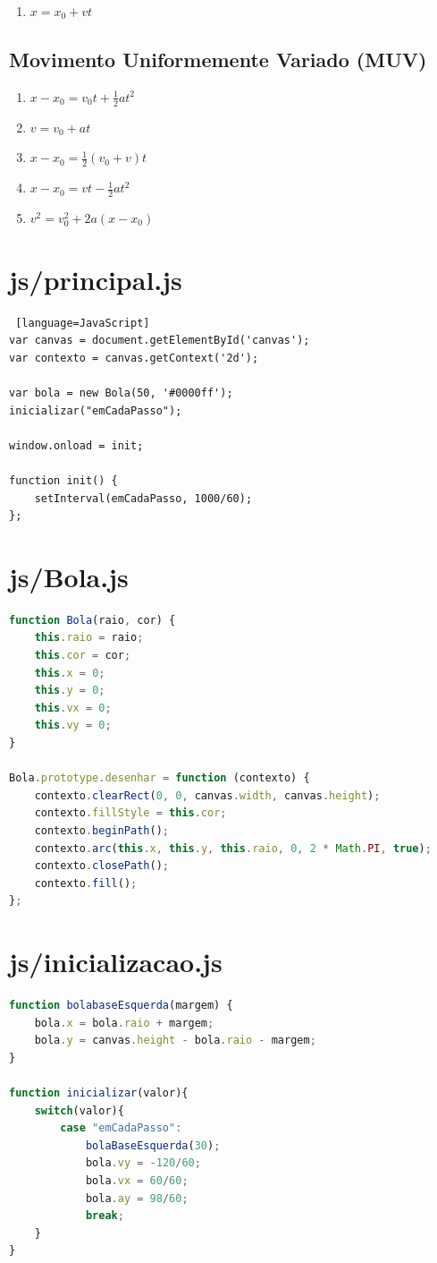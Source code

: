 \documentclass[12pt,a4paper,oneside]{article}
\begin{document}
\begin{enumerate}
	\item $x = x_0 + vt$ 
\end{enumerate}

\subsection{Movimento Uniformemente Variado (MUV)}

\begin{enumerate}
	\item $x - x_0 = v_0t + \frac{1}{2}at^2$ 
	\item $v = v_0 + at$ 
	\item $x - x_0 = \frac{1}{2}(v_0 + v)t$ 
	\item $x - x_0 = vt - \frac{1}{2} a t^2$
	\item $v^2 = v_0^2 + 2a(x - x_0)$
\end{enumerate}

\section*{js/principal.js}

\begin{lstlisting} [language=JavaScript]
var canvas = document.getElementById('canvas');
var contexto = canvas.getContext('2d');

var bola = new Bola(50, '#0000ff');
inicializar("emCadaPasso");

window.onload = init;

function init() {
	setInterval(emCadaPasso, 1000/60);
};
\end{lstlisting}

\newpage

\section*{js/Bola.js}

\begin{lstlisting}[language=JavaScript]
function Bola(raio, cor) {
	this.raio = raio;
	this.cor = cor;
	this.x = 0;
	this.y = 0;
	this.vx = 0;
	this.vy = 0;
}

Bola.prototype.desenhar = function (contexto) {
	contexto.clearRect(0, 0, canvas.width, canvas.height);
	contexto.fillStyle = this.cor;
	contexto.beginPath();
	contexto.arc(this.x, this.y, this.raio, 0, 2 * Math.PI, true);
	contexto.closePath();
	contexto.fill();
};
\end{lstlisting}

\section*{js/inicializacao.js}

\begin{lstlisting}[language=JavaScript]
function bolabaseEsquerda(margem) {
	bola.x = bola.raio + margem;
	bola.y = canvas.height - bola.raio - margem;
}

function inicializar(valor){
	switch(valor){
		case "emCadaPasso":
			bolaBaseEsquerda(30);
			bola.vy = -120/60; 
			bola.vx = 60/60;
			bola.ay = 98/60;
			break;
	}
}
\end{lstlisting}
\end{document}
